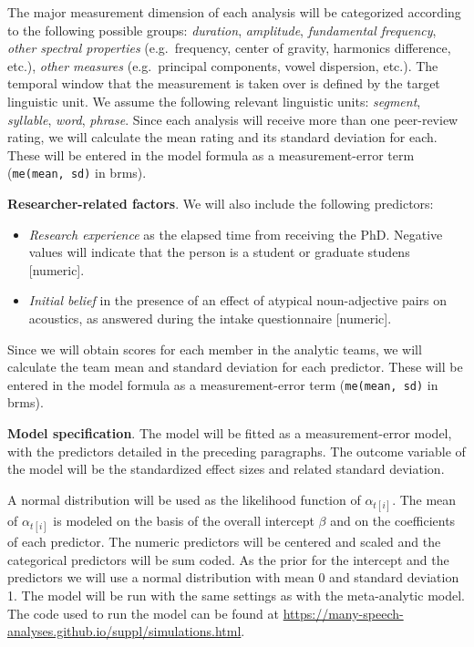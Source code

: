 \documentclass[Review,times,sageh]{sagej}
\providecommand{\tightlist}{\setlength{\itemsep}{0pt}\setlength{\parskip}{0pt}}
\begin{document}
The major measurement dimension of each analysis will be categorized according to the following possible groups: \emph{duration}, \emph{amplitude}, \emph{fundamental frequency}, \emph{other spectral properties} (e.g.~frequency, center of gravity, harmonics difference, etc.), \emph{other measures} (e.g.~principal components, vowel dispersion, etc.).
The temporal window that the measurement is taken over is defined by the target linguistic unit.
We assume the following relevant linguistic units: \emph{segment}, \emph{syllable}, \emph{word}, \emph{phrase}.
Since each analysis will receive more than one peer-review rating, we will calculate the mean rating and its standard deviation for each.
These will be entered in the model formula as a measurement-error term (\texttt{me(mean,\ sd)} in brms).

\textbf{Researcher-related factors}. We will also include the following predictors:

\begin{itemize}
\tightlist
\item
  \emph{Research experience} as the elapsed time from receiving the PhD. Negative values will indicate that the person is a student or graduate studens {[}numeric{]}.
\item
  \emph{Initial belief} in the presence of an effect of atypical noun-adjective pairs on acoustics, as answered during the intake questionnaire {[}numeric{]}.
\end{itemize}

Since we will obtain scores for each member in the analytic teams, we will calculate the team mean and standard deviation for each predictor.
These will be entered in the model formula as a measurement-error term (\texttt{me(mean,\ sd)} in brms).

\textbf{Model specification}. The model will be fitted as a measurement-error model, with the predictors detailed in the preceding paragraphs.
The outcome variable of the model will be the standardized effect sizes and related standard deviation.

A normal distribution will be used as the likelihood function of \(\alpha_{t[i]}\).
The mean of \(\alpha_{t[i]}\) is modeled on the basis of the overall intercept \(\beta\) and on the coefficients of each predictor.
The numeric predictors will be centered and scaled and the categorical predictors will be sum coded.
As the prior for the intercept and the predictors we will use a normal distribution with mean 0 and standard deviation 1.
The model will be run with the same settings as with the meta-analytic model.
The code used to run the model can be found at \url{https://many-speech-analyses.github.io/suppl/simulations.html}.
\end{document}
